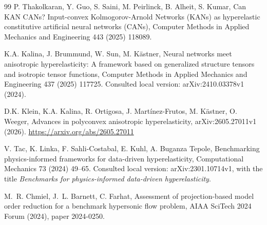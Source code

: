 \begin{thebibliography}{99}
P. Thakolkaran, Y. Guo, S. Saini, M. Peirlinck, B. Alheit, S. Kumar, Can KAN CANs? Input-convex Kolmogorov-Arnold Networks (KANs) as hyperelastic constitutive artificial neural networks (CANs), Computer Methods in Applied Mechanics and Engineering 443 (2025) 118089. 

K.A. Kalina, J. Brummund, W. Sun, M. K\"astner,
Neural networks meet anisotropic hyperelasticity: A framework based on generalized structure tensors and isotropic tensor functions,
Computer Methods in Applied Mechanics and Engineering 437 (2025) 117725.
Consulted local version: arXiv:2410.03378v1 (2024).

D.K. Klein, K.A. Kalina, R. Ortigosa, J. Mart\'inez-Frutos, M. K\"astner, O. Weeger, Advances in polyconvex anisotropic hyperelasticity, arXiv:2605.27011v1 (2026). \url{https://arxiv.org/abs/2605.27011}

V. Tac, K. Linka, F. Sahli-Costabal, E. Kuhl, A. Buganza Tepole,
Benchmarking physics-informed frameworks for data-driven hyperelasticity,
Computational Mechanics 73 (2024) 49--65.
Consulted local version: arXiv:2301.10714v1, with the title \emph{Benchmarks for physics-informed data-driven hyperelasticity}.

M.~R. Chmiel, J.~L. Barnett, C. Farhat, Assessment of
projection-based model order reduction for a benchmark hypersonic flow
problem, AIAA SciTech 2024 Forum (2024), paper 2024-0250.

\end{thebibliography}

